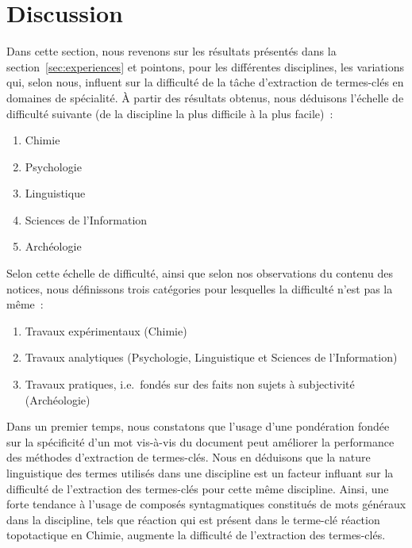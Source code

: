 \section{Discussion}
\label{sec:discussion}
  Dans cette section, nous revenons sur les résultats présentés dans la
  section~\ref{sec:experiences} et pointons, pour les différentes disciplines,
  les variations qui, selon nous, influent sur la difficulté de la tâche
  d'extraction de termes-clés en domaines de spécialité. À partir des résultats
  obtenus, nous déduisons l'échelle de difficulté suivante (de la discipline la
  plus difficile à la plus facile)~:
  \begin{enumerate}
    \item{Chimie}
    \item{Psychologie}
    \item{Linguistique}
    \item{Sciences de l'Information}
    \item{Archéologie}
  \end{enumerate}
  Selon cette échelle de difficulté, ainsi que selon nos observations du contenu
  des notices, nous définissons trois catégories pour lesquelles la difficulté
  n'est pas la même~:
  \begin{enumerate}
    \item{Travaux expérimentaux (Chimie)}
    \item{Travaux analytiques (Psychologie, Linguistique et Sciences de
          l'Information)}
    \item{Travaux pratiques, i.e.~fondés sur des faits non sujets à subjectivité
          (Archéologie)}
  \end{enumerate}

  Dans un premier temps, nous constatons que l'usage d'une pondération fondée
  sur la spécificité d'un mot vis-à-vis du document
  peut améliorer la performance des méthodes d'extraction de termes-clés. Nous
  en déduisons que la nature linguistique des termes utilisés dans une
  discipline est un facteur influant sur la difficulté de l'extraction des
  termes-clés pour cette même discipline. Ainsi, une forte tendance à l'usage de
  composés syntagmatiques constitués de mots généraux dans la discipline, tels
  que \og{}réaction\fg{} qui est présent dans le terme-clé \og{}réaction
  topotactique\fg{} en Chimie, augmente la difficulté de l'extraction des
  termes-clés.


